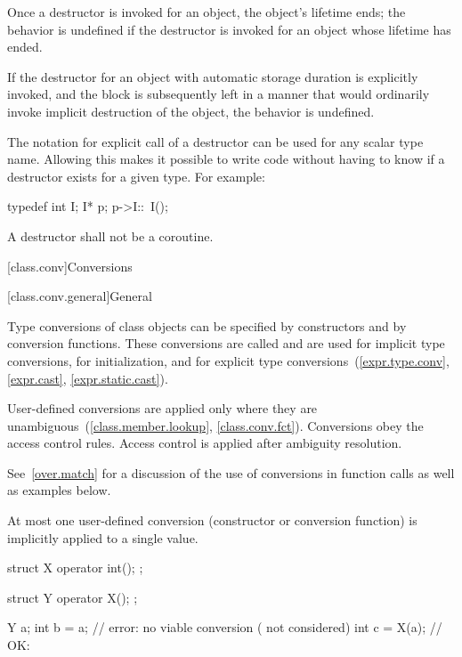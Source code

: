 \pnum
Once a destructor is invoked for an object, the object's lifetime ends;
the behavior is undefined if the destructor is invoked
for an object whose lifetime has ended.
\begin{example}
If the destructor for an object with automatic storage duration is explicitly invoked,
and the block is subsequently left in a manner that would ordinarily
invoke implicit destruction of the object, the behavior is undefined.
\end{example}

\pnum
\begin{note}
%
The notation for explicit call of a destructor can be used for any scalar type
name.
Allowing this makes it possible to write code without having to know if a
destructor exists for a given type.
For example:
\begin{codeblock}
typedef int I;
I* p;
p->I::~I();
\end{codeblock}
\end{note}

\pnum
A destructor shall not be a coroutine.

[class.conv]{Conversions}

[class.conv.general]{General}

\pnum
{}%
%
%
%
Type conversions of class objects can be specified by constructors and
by conversion functions.
These conversions are called
and are used for implicit type conversions,
for initialization,
and for explicit type conversions~(\ref{expr.type.conv}, \ref{expr.cast},
\ref{expr.static.cast}).

\pnum
User-defined conversions are applied only where they are unambiguous~(\ref{class.member.lookup}, \ref{class.conv.fct}).
Conversions obey the access control rules.
Access control is applied after ambiguity resolution.

\pnum
\begin{note}
See~\ref{over.match} for a discussion of the use of conversions in function calls
as well as examples below.
\end{note}

\pnum
{}%
At most one user-defined conversion (constructor or conversion function)
is implicitly applied to a single value.
\begin{example}
\begin{codeblock}
struct X {
  operator int();
};

struct Y {
  operator X();
};

Y a;
int b = a;          // error: no viable conversion ( not considered)
int c = X(a);       // OK: 
\end{codeblock}
\end{example}

